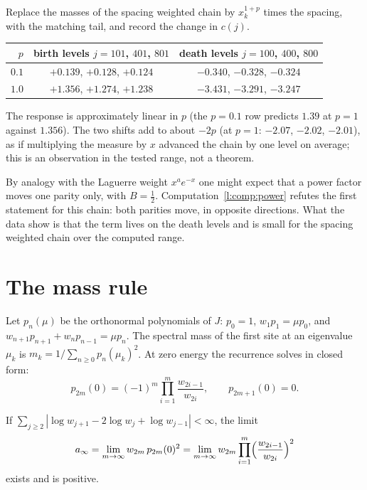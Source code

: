 \begin{remark}\label{l:comp:power}
Replace the masses of the spacing weighted chain by $x_k^{1+p}$ times the spacing, with the matching tail, and record the change in $c(j)$. %
\begin{center}\small
\begin{tabular}{@{}rcc@{}}
\toprule
$p$ & birth levels $j=101$, $401$, $801$ & death levels $j=100$, $400$, $800$\\
\midrule
$0.1$ & $+0.139$, $+0.128$, $+0.124$ & $-0.340$, $-0.328$, $-0.324$\\
$1.0$ & $+1.356$, $+1.274$, $+1.238$ & $-3.431$, $-3.291$, $-3.247$\\
\bottomrule
\end{tabular}
\end{center}
The response is approximately linear in $p$ (the $p=0.1$ row predicts $1.39$ at $p=1$ against $1.356$). The two shifts add to about $-2p$ (at $p=1$: $-2.07$, $-2.02$, $-2.01$), as if multiplying the measure by $x$ advanced the chain by one level on average; this is an observation in the tested range, not a theorem.
\end{remark}

\begin{remark}
By analogy with the Laguerre weight $x^ae^{-x}$ one might expect that a power factor moves one parity only, with $B=\frac12$. Computation~\ref{l:comp:power} refutes the first statement for this chain: both parities move, in opposite directions. What the data show is that the term lives on the death levels and is small for the spacing weighted chain over the computed range.
\end{remark}

\section{The mass rule}\label{l:sec:mass}

Let $p_n(\mu)$ be the orthonormal polynomials of $J$: $p_0=1$, $w_1p_1=\mu p_0$, and $w_{n+1}p_{n+1}+w_np_{n-1}=\mu p_n$. The spectral mass of the first site at an eigenvalue $\mu_k$ is $m_k=1/\sum_{n\ge0}p_n(\mu_k)^2$. At zero energy the recurrence solves in closed form:
\[
p_{2m}(0)=(-1)^m\prod_{i=1}^m\frac{w_{2i-1}}{w_{2i}},\qquad p_{2m+1}(0)=0 .
\]

\begin{lemma}\label{l:lem:ainf}
If $\sum_{j\ge2}|\log w_{j+1}-2\log w_j+\log w_{j-1}|<\infty$, the limit
\[
a_\infty=\lim_{m\to\infty}w_{2m}\,p_{2m}(0)^2=\lim_{m\to\infty}w_{2m}\prod_{i=1}^m\Bigl(\frac{w_{2i-1}}{w_{2i}}\Bigr)^2
\]
exists and is positive.
\end{lemma}

